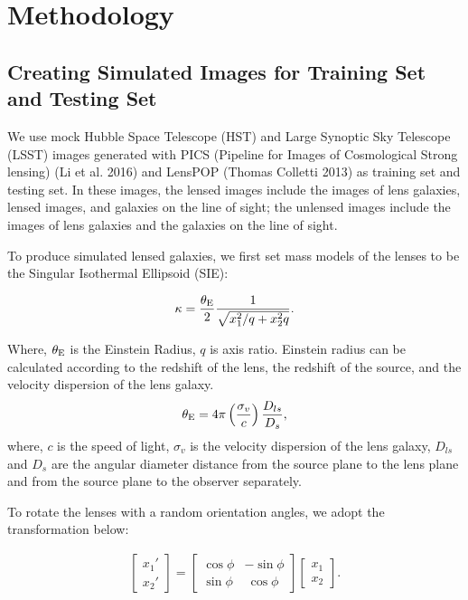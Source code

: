 \documentclass{emulateapj}
\begin{document}
\section{Methodology}
\label{sec:methods}
\subsection{Creating Simulated Images for Training Set and Testing Set}

We use mock Hubble Space Telescope (HST) and Large Synoptic Sky
Telescope (LSST) images generated with PICS (Pipeline for Images of
Cosmological Strong lensing) (Li et al. 2016) and LensPOP (Thomas
Colletti 2013) as training set and testing set. In these images, the
lensed images include the images of lens galaxies, lensed images, and
galaxies on the line of sight; the unlensed images include the images
of lens galaxies and the galaxies on the line of sight.

To produce simulated lensed galaxies, we first set mass models of the
lenses to be the Singular Isothermal Ellipsoid (SIE):

\begin{equation}
\kappa = \frac{\theta_{\rm E}}{2}\frac{1}{\sqrt{x_1^2/q+x_2^2 q}}.
\end{equation}


Where, $\theta_{\rm E}$ is the Einstein Radius, $q$ is axis
ratio. Einstein radius can be calculated according to the redshift of
the lens, the redshift of the source, and the velocity dispersion of
the lens galaxy.
\begin{equation}
\theta_{\rm E} = 4\pi\left(\frac{\sigma_v}{c}\right)\frac{D_{ls}}{D_{s}}, 
\end{equation}
where, $c$ is the speed of light, $\sigma_v$ is the velocity
dispersion of the lens galaxy, $D_{ls}$ and $D_{s}$ are the angular
diameter distance from the source plane to the lens plane and from the
source plane to the observer separately.

To rotate the lenses with a random orientation angles, we adopt the
transformation below:

\begin{eqnarray}
\label{eq:rotation}
\begin{bmatrix}

    x_{1}\prime      \\
    x_{2}\prime 
\end{bmatrix}
= 
\begin{bmatrix}
    \cos \phi  &  -\sin \phi      \\
    \sin \phi  &  ~\cos \phi      
\end{bmatrix} 
\begin{bmatrix}
    x_1      \\
    x_2      
\end{bmatrix} .
\end{eqnarray}
\end{document}
